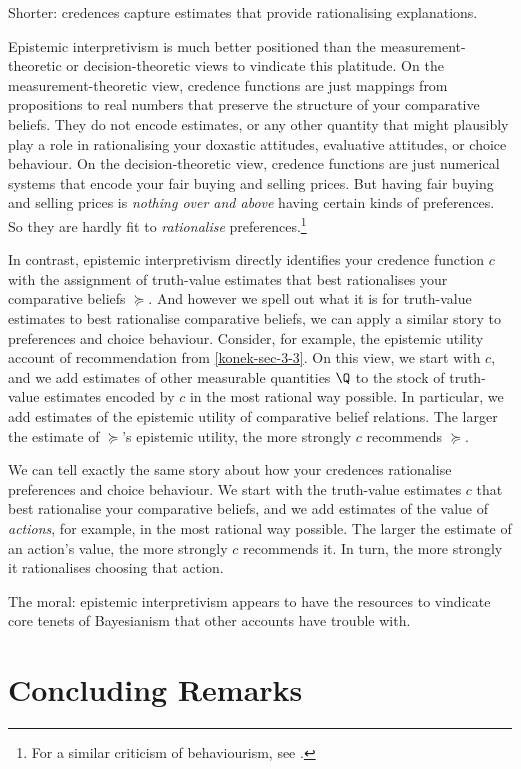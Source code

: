 Shorter: credences capture estimates that provide rationalising explanations.

Epistemic interpretivism is much better positioned than the mea\-su\-re\-ment-theoretic or decision-theoretic views to vindicate this platitude. On the measurement-theoretic view, credence functions are just mappings from propositions to real numbers that preserve the structure of your comparative beliefs. They do not encode estimates, or any other quantity that might plausibly play a role in rationalising your doxastic attitudes, evaluative attitudes, or choice behaviour. On the decision-theoretic view, credence functions are just numerical systems that encode your fair buying and selling prices. But having fair buying and selling prices is \textit{nothing over and above} having certain kinds of preferences. So they are hardly fit to \textit{rationalise} preferences.\footnote{For a similar criticism of behaviourism, see \citet[Section 1.3]{Joyce1999}.}

In contrast, epistemic interpretivism directly identifies your credence function $c$ with the assignment of truth-value estimates that best rationalises your comparative beliefs $\succeq$. And however we spell out what it is for truth-value estimates to best rationalise comparative beliefs, we can apply a similar story to preferences and choice behaviour. Consider, for example, the epistemic utility account of recommendation from \autoref{konek-sec-3-3}. On this view, we start with $c$, and we add estimates of other measurable quantities $\Q$ to the stock of truth-value estimates encoded by $c$ in the most rational way possible. In particular, we add estimates of the epistemic utility of comparative belief relations. The larger the estimate of $\succeq$'s epistemic utility, the more strongly $c$ recommends $\succeq$.

We can tell exactly the same story about how your credences rationalise preferences and choice behaviour. We start with the truth-value estimates $c$ that best rationalise your comparative beliefs, and we add estimates of the value of \textit{actions}, for example, in the most rational way possible. The larger the estimate of an action's value, the more strongly $c$ recommends it. In turn, the more strongly it rationalises choosing that action.

The moral: epistemic interpretivism appears to have the resources to vindicate core tenets of Bayesianism that other accounts have trouble with.


\section{Concluding Remarks}\label{konek-sec-8}

